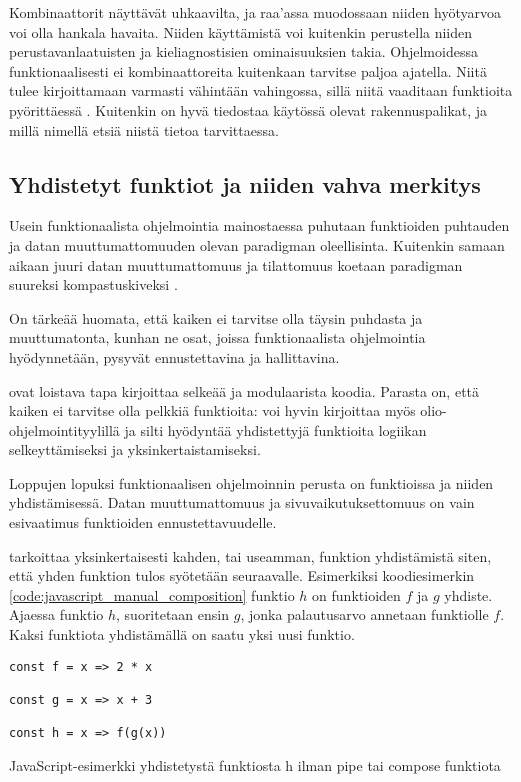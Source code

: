 Kombinaattorit näyttävät uhkaavilta, ja raa'assa muodossaan niiden hyötyarvoa voi olla hankala havaita. Niiden käyttämistä voi kuitenkin perustella niiden perustavanlaatuisten ja kieliagnostisien ominaisuuksien takia. Ohjelmoidessa funktionaalisesti ei kombinaattoreita kuitenkaan tarvitse paljoa ajatella. Niitä tulee kirjoittamaan varmasti vähintään vahingossa, sillä niitä vaaditaan funktioita pyörittäessä \cite{javascript_combinators}. Kuitenkin on hyvä tiedostaa käytössä olevat rakennuspalikat, ja millä nimellä etsiä niistä tietoa tarvittaessa.

\subsection{Yhdistetyt funktiot ja niiden vahva merkitys}

Usein funktionaalista ohjelmointia mainostaessa puhutaan funktioiden puhtauden ja datan muuttumattomuuden olevan paradigman oleellisinta. Kuitenkin samaan aikaan juuri datan muuttumattomuus ja tilattomuus koetaan paradigman suureksi kompastuskiveksi \cite{cantarella_fp_haitat,is_reduce_bad,vakil2016}.

On tärkeää huomata, että kaiken ei tarvitse olla täysin puhdasta ja muuttumatonta, kunhan ne osat, joissa funktionaalista ohjelmointia hyödynnetään, pysyvät ennustettavina ja hallittavina.

 ovat loistava tapa kirjoittaa selkeää ja modulaarista koodia. Parasta on, että kaiken ei tarvitse olla pelkkiä funktioita: voi hyvin kirjoittaa myös olio-ohjelmointityylillä ja silti hyödyntää yhdistettyjä funktioita logiikan selkeyttämiseksi ja yksinkertaistamiseksi.

Loppujen lopuksi funktionaalisen ohjelmoinnin perusta on funktioissa ja niiden yhdistämisessä. Datan muuttumattomuus ja sivuvaikutuksettomuus on vain esivaatimus funktioiden ennustettavuudelle.

 tarkoittaa yksinkertaisesti kahden, tai useamman, funktion yhdistämistä siten, että yhden funktion tulos syötetään seuraavalle. Esimerkiksi koodiesimerkin \ref{code:javascript_manual_composition} funktio $h$ on funktioiden $f$ ja $g$ yhdiste. Ajaessa funktio $h$, suoritetaan ensin $g$, jonka palautusarvo annetaan funktiolle $f$. Kaksi funktiota yhdistämällä on saatu yksi uusi funktio.

\begin{code}
    \begin{verbatim}
const f = x => 2 * x

const g = x => x + 3

const h = x => f(g(x))
\end{verbatim}
    \caption{JavaScript-esimerkki yhdistetystä funktiosta h ilman pipe tai compose funktiota}
    \label{code:javascript_manual_composition}
\end{code}

